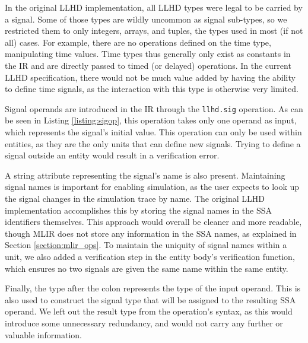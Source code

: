 In the original LLHD implementation, all LLHD types were legal to be carried by a signal. Some of those types are wildly uncommon as signal sub-types, so we restricted them to only integers, arrays, and tuples, the types used in most (if not all) cases. For example, there are no operations defined on the time type, manipulating time values. Time types thus generally only exist as constants in the IR and are directly passed to timed (or delayed) operations. In the current LLHD specification, there would not be much value added by having the ability to define time signals, as the interaction with this type is otherwise very limited.

Signal operands are introduced in the IR through the \texttt{llhd.sig} operation. As can be seen in Listing \ref{listing:sigop}, this operation takes only one operand as input, which represents the signal's initial value. This operation can only be used within entities, as they are the only units that can define new signals. Trying to define a signal outside an entity would result in a verification error.

A string attribute representing the signal's name is also present. Maintaining signal names is important for enabling simulation, as the user expects to look up the signal changes in the simulation trace by name. The original LLHD implementation accomplishes this by storing the signal names in the SSA identifiers themselves. This approach would overall be cleaner and more readable, though MLIR does not store any information in the SSA names, as explained in Section \ref{section:mlir_ops}. To maintain the uniquity of signal names within a unit, we also added a verification step in the entity body's verification function, which ensures no two signals are given the same name within the same entity.

Finally, the type after the colon represents the type of the input operand. This is also used to construct the signal type that will be assigned to the resulting SSA operand. We left out the result type from the operation's syntax, as this would introduce some unnecessary redundancy, and would not carry any further or valuable information.

